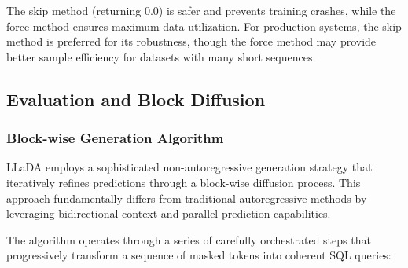 \documentclass[a4paper,12pt]{article}
\begin{document}
The skip method (returning 0.0) is safer and prevents training crashes, while the force method ensures maximum data utilization. For production systems, the skip method is preferred for its robustness, though the force method may provide better sample efficiency for datasets with many short sequences.

\subsection{Evaluation and Block Diffusion}

\subsubsection*{Block-wise Generation Algorithm}
LLaDA employs a sophisticated non-autoregressive generation strategy that iteratively refines predictions through a block-wise diffusion process. This approach fundamentally differs from traditional autoregressive methods by leveraging bidirectional context and parallel prediction capabilities.

The algorithm operates through a series of carefully orchestrated steps that progressively transform a sequence of masked tokens into coherent SQL queries:
\end{document}
